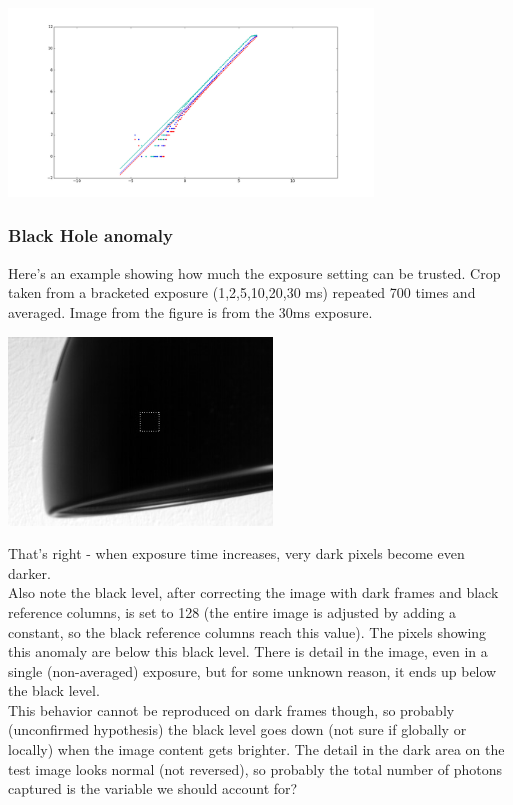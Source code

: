 \begin{center}
\includegraphics[height=5cm]{images/curve-old}
\end{center}


\subsubsection{Black Hole anomaly}

Here's an example showing how much the exposure setting can be trusted. Crop taken from a bracketed exposure (1,2,5,10,20,30 ms) repeated 700 times and averaged. Image from the figure is from the 30ms exposure.\\ 

\begin{center}
\includegraphics[height=5cm]{images/blackhole}
\end{center}

That's right - when exposure time increases, very dark pixels become even darker.\\

Also note the black level, after correcting the image with dark frames and black reference columns, is set to 128 (the entire image is adjusted by adding a constant, so the black reference columns reach this value). The pixels showing this anomaly are below this black level. There is detail in the image, even in a single (non-averaged) exposure, but for some unknown reason, it ends up below the black level.\\

This behavior cannot be reproduced on dark frames though, so probably (unconfirmed hypothesis) the black level goes down (not sure if globally or locally) when the image content gets brighter. The detail in the dark area on the test image looks normal (not reversed), so probably the total number of photons captured is the variable we should account for? \\


